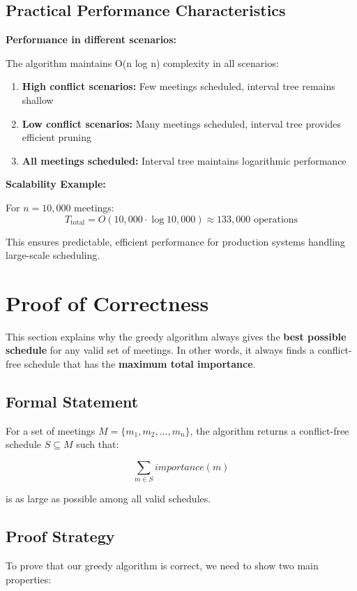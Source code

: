 \documentclass[conference]{IEEEtran}
\begin{document}
\subsection{Practical Performance Characteristics}

\textbf{Performance in different scenarios:}

The algorithm maintains O(n log n) complexity in all scenarios:
\begin{enumerate}
    \item \textbf{High conflict scenarios:} Few meetings scheduled, interval tree remains shallow
    \item \textbf{Low conflict scenarios:} Many meetings scheduled, interval tree provides efficient pruning
    \item \textbf{All meetings scheduled:} Interval tree maintains logarithmic performance
\end{enumerate}

\textbf{Scalability Example:}

For $n = 10,000$ meetings:
\begin{equation}
T_{\text{total}} = O(10,000 \cdot \log 10,000) \approx 133,000 \text{ operations}
\end{equation}

This ensures predictable, efficient performance for production systems handling large-scale scheduling.

\section{Proof of Correctness}

This section explains why the greedy algorithm always gives the \textbf{best possible schedule} for any valid set of meetings. 
In other words, it always finds a conflict-free schedule that has the \textbf{maximum total importance}.

\subsection{Formal Statement}
For a set of meetings $M = \{m_1, m_2, \ldots, m_n\}$, the algorithm returns a conflict-free schedule $S \subseteq M$ such that:

\[
\sum_{m \in S} importance(m)
\]

is as large as possible among all valid schedules.

\subsection{Proof Strategy}
To prove that our greedy algorithm is correct, we need to show two main properties:
\end{document}
